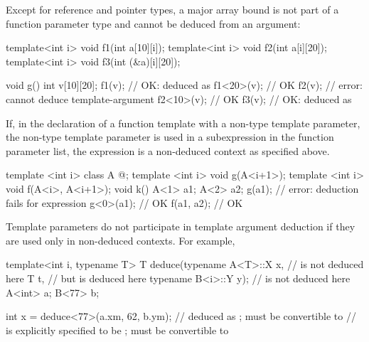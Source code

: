 \pnum
\begin{note}
Except for reference and pointer types, a major array bound is not part of a
function parameter type and cannot be deduced from an argument:
\begin{codeblock}
template<int i> void f1(int a[10][i]);
template<int i> void f2(int a[i][20]);
template<int i> void f3(int (&a)[i][20]);

void g() {
  int v[10][20];
  f1(v);                        // OK:  deduced as 
  f1<20>(v);                    // OK
  f2(v);                        // error: cannot deduce template-argument 
  f2<10>(v);                    // OK
  f3(v);                        // OK:  deduced as 
}
\end{codeblock}
\end{note}

\pnum
\begin{note}
If, in the declaration of a function template with a non-type
template parameter, the non-type template parameter
is used in a subexpression in the function parameter list,
the expression is a non-deduced context as specified above.
\begin{example}
\begin{codeblock}
template <int i> class A { @\commentellip@ };
template <int i> void g(A<i+1>);
template <int i> void f(A<i>, A<i+1>);
void k() {
  A<1> a1;
  A<2> a2;
  g(a1);                        // error: deduction fails for expression 
  g<0>(a1);                     // OK
  f(a1, a2);                    // OK
}
\end{codeblock}
\end{example}
\end{note}

\pnum
\begin{note}
Template parameters do not participate in template argument deduction if
they are used only in non-deduced contexts.
For example,

\begin{codeblock}
template<int i, typename T>
T deduce(typename A<T>::X x,    //  is not deduced here
         T t,                   // but  is deduced here
         typename B<i>::Y y);   //  is not deduced here
A<int> a;
B<77>  b;

int    x = deduce<77>(a.xm, 62, b.ym);
//  deduced as ;  must be convertible to 
//  is explicitly specified to be ;  must be convertible to 
\end{codeblock}
\end{note}

